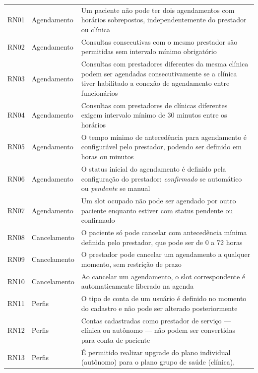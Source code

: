 \begin{center}
\begin{longtable}{p{1.2cm}p{3cm}p{7.5cm}}
  RN01 & Agendamento
      & Um paciente não pode ter dois
        agendamentos com horários
        sobrepostos, independentemente
        do prestador ou clínica \\
  RN02 & Agendamento
      & Consultas consecutivas com o mesmo
        prestador são permitidas sem
        intervalo mínimo obrigatório \\
  RN03 & Agendamento
      & Consultas com prestadores diferentes
        da mesma clínica podem ser agendadas
        consecutivamente se a clínica tiver
        habilitado a conexão de agendamento
        entre funcionários \\
  RN04 & Agendamento
      & Consultas com prestadores de clínicas
        diferentes exigem intervalo mínimo
        de 30 minutos entre os horários \\
  RN05 & Agendamento
      & O tempo mínimo de antecedência para
        agendamento é configurável pelo
        prestador, podendo ser definido
        em horas ou minutos \\
  RN06 & Agendamento
      & O status inicial do agendamento é
        definido pela configuração do
        prestador: \textit{confirmado} se
        automático ou \textit{pendente}
        se manual \\
  RN07 & Agendamento
      & Um slot ocupado não pode ser
        agendado por outro paciente enquanto
        estiver com status pendente ou
        confirmado \\
  RN08 & Cancelamento
      & O paciente só pode cancelar com
        antecedência mínima definida pelo
        prestador, que pode ser de 0 a
        72 horas \\
  RN09 & Cancelamento
      & O prestador pode cancelar um
        agendamento a qualquer momento,
        sem restrição de prazo \\
  RN10 & Cancelamento
      & Ao cancelar um agendamento, o slot
        correspondente é automaticamente
        liberado na agenda \\
  RN11 & Perfis
      & O tipo de conta de um usuário é
        definido no momento do cadastro
        e não pode ser alterado
        posteriormente \\
  RN12 & Perfis
      & Contas cadastradas como prestador
        de serviço --- clínica ou autônomo
        --- não podem ser convertidas para
        conta de paciente \\
  RN13 & Perfis
      & É permitido realizar upgrade do
        plano individual (autônomo) para
        o plano grupo de saúde (clínica),

\end{longtable}
\end{center}
